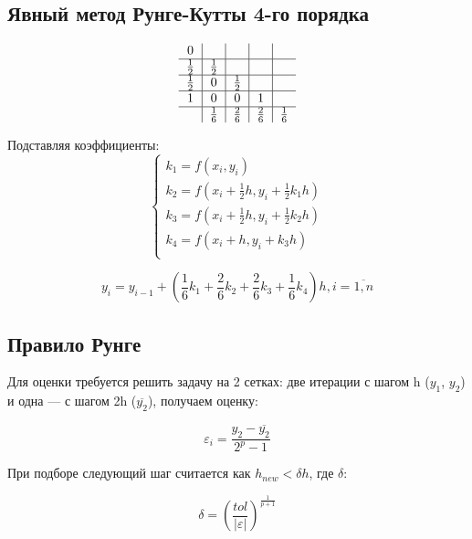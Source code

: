 \documentclass[oneside, final, 11pt]{article}
\begin{document}
\subsection{Явный метод Рунге-Кутты 4-го порядка}
\begin{equation}
\begin{tabular}{c|c|c|c|c}
    0           &   &   &   &                   \\\hline
$\frac{1}{2}$   & $\frac{1}{2}$  &   &   &      \\\hline
$\frac{1}{2}$   & 0  & $\frac{1}{2}$  &   &     \\\hline
    1           & 0  & 0  & 1  &                \\\hline
                & $\frac{1}{6}$ & $\frac{2}{6}$ & $\frac{2}{6}$ & $\frac{1}{6}$\\
\end{tabular}
\end{equation}

Подставляя коэффициенты:
\begin{equation}
    \begin{cases}
    k_1 = f(x_i, y_i) \\
    k_2 = f(x_i + \frac{1}{2} h, y_i + \frac{1}{2} k_1 h) \\
    k_3 = f(x_i + \frac{1}{2} h, y_i + \frac{1}{2} k_2 h) \\
    k_4 = f(x_i + h, y_i + k_3 h) \\
    \end{cases}
\end{equation}

\begin{equation}
y_i = y_{i-1} + ( \frac{1}{6} k_1 + \frac{2}{6} k_2 + \frac{2}{6} k_3 + \frac{1}{6} k_4) h, i=\overline{1,n}
\end{equation}

\subsection{Правило Рунге}
Для оценки требуется решить задачу на 2 сетках: две итерации с шагом h ($y_1$, $y_2$)  и одна — с шагом 2h ($\overline{y_2}$), получаем оценку:

\begin{equation}
\varepsilon_i = \frac{y_2-\overline{y_2}}{2^p-1}
\end{equation}

При подборе следующий шаг считается как $h_{new}<\delta h$, где $\delta$:

\begin{equation}
\delta = \left(\frac{tol}{|\varepsilon|}\right)^{\frac{1}{p+1}}
\end{equation}
\end{document}
